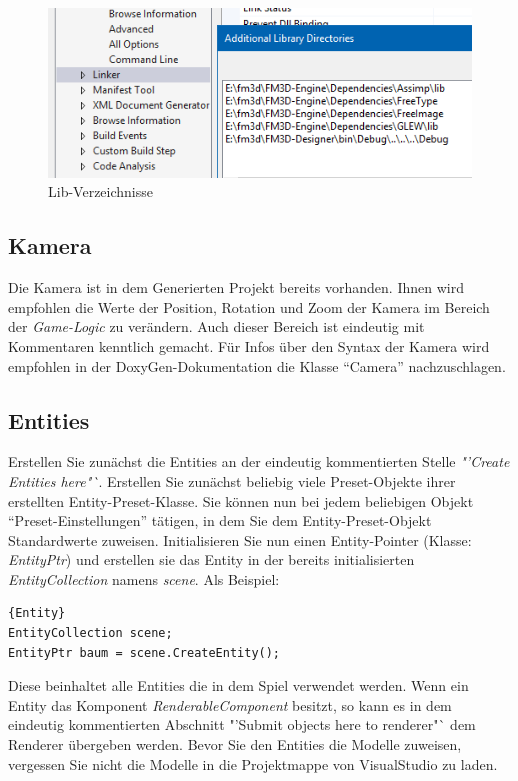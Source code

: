 \begin{figure}
	\begin{center}
		\includegraphics[width=\textwidth]{04verwendung/Engine/lib.png}
		\caption{Lib-Verzeichnisse}\label{liblib}
	\end{center}
\end{figure}

\subsection{Kamera}
Die Kamera ist in dem Generierten Projekt bereits vorhanden. Ihnen wird empfohlen die Werte der Position, Rotation und Zoom der Kamera im Bereich der \textit{Game-Logic} zu verändern. Auch dieser Bereich ist eindeutig mit Kommentaren kenntlich gemacht. Für Infos über den Syntax der Kamera wird empfohlen in der DoxyGen-Dokumentation die Klasse "`Camera"' nachzuschlagen.

\subsection{Entities}
Erstellen Sie zunächst die Entities an der eindeutig kommentierten Stelle \textit{"'Create Entities here"`}. Erstellen Sie zunächst beliebig viele Preset-Objekte ihrer erstellten Entity-Preset-Klasse. Sie können nun bei jedem beliebigen Objekt "`Preset-Einstellungen"' tätigen, in dem Sie dem Entity-Preset-Objekt Standardwerte zuweisen. 
Initialisieren Sie nun einen Entity-Pointer (Klasse: \textit{EntityPtr}) und erstellen sie das Entity in der bereits initialisierten \textit{EntityCollection} namens \textit{scene}. Als Beispiel:
\begin{lstlisting}{Entity}
EntityCollection scene;
EntityPtr baum = scene.CreateEntity();
\end{lstlisting}
Diese beinhaltet alle Entities die in dem Spiel verwendet werden.
Wenn ein Entity das Komponent \textit{RenderableComponent} besitzt, so kann es in dem eindeutig kommentierten Abschnitt "'Submit objects here to renderer"` dem Renderer übergeben werden.
Bevor Sie den Entities die Modelle zuweisen, vergessen Sie nicht die Modelle in die Projektmappe von VisualStudio zu laden.

